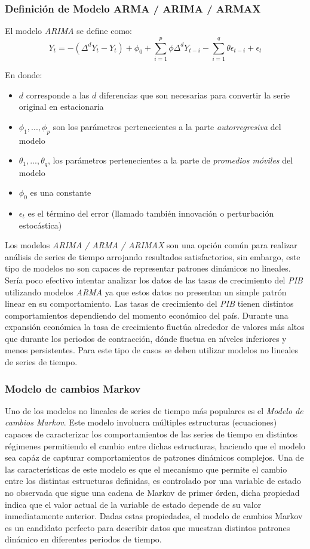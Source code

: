 {\subsubsection*{Definición de Modelo ARMA / ARIMA / ARMAX}

El modelo \emph{ARIMA} se define como: $$Y_t = -(\Delta^d Y_t - Y_t) + \phi_0 + \sum_{i=1}^p \phi \Delta^d Y_{t-i} - \sum_{i=1}^q \theta \epsilon_{t-i} + \epsilon_t$$

En donde:
\begin{itemize}
  \item $d$ corresponde a las $d$ diferencias que son necesarias para convertir la serie original en estacionaria
  \item $\phi_1 ,..., \phi_p$ son los parámetros pertenecientes a la parte \emph{autorregresiva} del modelo
  \item $\theta_1 ,..., \theta_q$, los parámetros pertenecientes a la parte de \emph{promedios móviles} del modelo
  \item $\phi_0$ es una constante
  \item $\epsilon_t$ es el término del error (llamado también innovación o perturbación estocástica)
\end{itemize}

Los modelos \emph{ARIMA / ARMA / ARIMAX} son una opción común para realizar análisis de series de tiempo arrojando resultados satisfactorios, sin embargo, este tipo de modelos no son capaces de representar patrones dinámicos no lineales. Sería poco efectivo intentar analizar los datos de las tasas de crecimiento del \emph{PIB} utilizando modelos \emph{ARMA} ya que estos datos no presentan un simple patrón linear en su comportamiento. Las tasas de crecimiento del \emph{PIB} tienen distintos comportamientos dependiendo del momento económico del país. Durante una expansión económica la tasa de crecimiento fluctúa alrededor de valores más altos que durante los periodos de contracción, dónde fluctua en níveles inferiores y menos persistentes. Para este tipo de casos se deben utilizar modelos no lineales de series de tiempo.

\subsubsection*{Modelo de cambios Markov}

Uno de los modelos no lineales de series de tiempo más populares es el \emph{Modelo de cambios Markov}. Este modelo involucra múltiples estructuras (ecuaciones) capaces de caracterizar los comportamientos de las series de tiempo en distintos régimenes permitiendo el cambio entre dichas estructuras, haciendo que el modelo sea capáz de capturar comportamientos de patrones dinámicos complejos. Una de las características de este modelo es que el mecanísmo que permite el cambio entre los distintas estructuras definidas, es controlado por una variable de estado no observada que sigue una cadena de Markov de primer órden, dicha propiedad indica que el valor actual de la variable de estado depende de su valor inmediatamente anterior. Dadas estas propiedades, el modelo de cambios Markov es un candidato perfecto para describir datos que muestran distintos patrones dinámico en diferentes periodos de tiempo.


}
